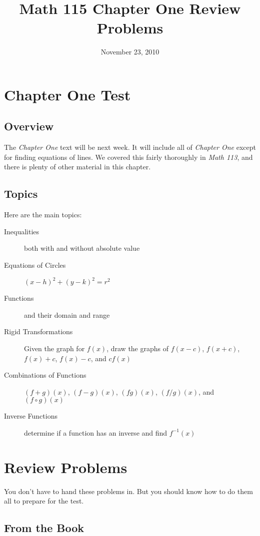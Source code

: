\documentclass[fleqn,addpoints]{exam}
\title{Math 115 Chapter One Review Problems}
\date{November 23, 2010}
\author{}
\begin{document}
\maketitle

\section{Chapter One Test}

\subsection{Overview}

The \emph{Chapter One} text will be next week.  It will include all of \emph{Chapter One} except for finding equations
of lines.  We covered this fairly thoroughly in \emph{Math 113}, and there is plenty of other material in this chapter.

\subsection{Topics}

Here are the main topics:
\begin{description}
\item[Inequalities] both with and without absolute value
\item[Equations of Circles] $(x-h)^2 + (y-k)^2 = r^2$
\item[Functions] and their domain and range
\item[Rigid Transformations] Given the graph for $f(x)$, draw the graphs of $f(x-c)$, $f(x+c)$, $f(x) + c$, $f(x) - c$,
  and $cf(x)$
\item[Combinations of Functions] $(f+g)(x)$, $(f-g)(x)$, $(fg)(x)$, $(f/g)(x)$, and $(f \circ g)(x)$
\item[Inverse Functions] determine if a function has an inverse and find $f^{-1}(x)$
\end{description}

\pagebreak

\section{Review Problems}

You don't have to hand these problems in.  But you should know how to do them all to prepare for the test.

\subsection{From the Book}
\end{document}
